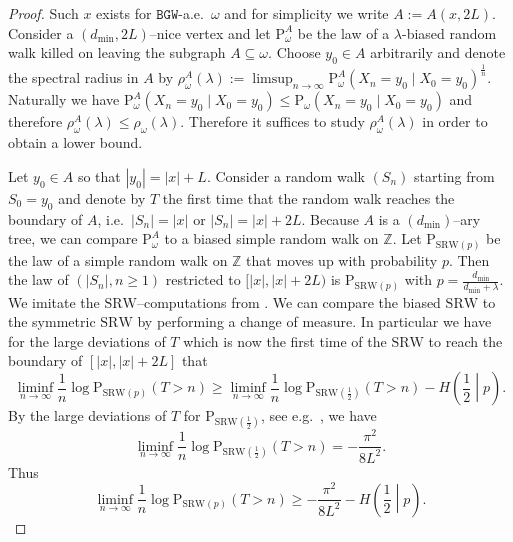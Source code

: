 \documentclass[11 pt]{article}
\theoremstyle{definition}
\numberwithin{equation}{section}
\newcommand{\ZZ}{\mathbb{Z}}
\newcommand{\Pws}{\mathrm{P}_{\omega}} %
\begin{document}
\begin{proof}
	 Such $x$ exists for $\mathtt{BGW}$-a.e.\ $\omega$ and for simplicity we write $A:= A(x,2L)$. Consider a $(d_{\min},2L)$--nice vertex and let $\mathrm{P}^{A}_{\omega}$ be the law of a $\lambda$-biased random walk killed on leaving the subgraph $A\subseteq \omega$. Choose $y_0 \in A$ arbitrarily and denote the spectral radius in $A$ by $\rho^A_{\omega}(\lambda):=\limsup_{n\to \infty} \Pws^{A}(X_n= y_0\mid X_0 = y_0)^{\frac{1}{n}}$.  
	  Naturally we have $\Pws^{A}(X_n= y_0\mid X_0 = y_0)\le \Pws(X_n= y_0\mid X_0 = y_0)$ and therefore $\rho_\omega^A(\lambda) \leq \rho_\omega(\lambda)$. Therefore it suffices to study $\rho^A_{\omega}(\lambda)$ in order to obtain a lower bound.
	 
	 Let $y_0\in A$ so that $|y_0| = |x|+ L$. Consider a random walk $(S_n)$ starting from $S_0 = y_0$ and denote  by $T$ the first time that the random walk reaches the boundary of $A$, i.e.\ $|S_n| = |x|$ or $|S_n|= |x|+2L$. Because $A$ is a $(d_{\min})$--ary tree, we can compare $ \Pws^{A}$ to a biased simple random walk on $\ZZ$. Let $\mathrm{P}_{\mathrm{SRW}(p)}$ be the law of a simple random walk on $\ZZ$ that moves up with probability $p$. Then the law of $(\vert S_n \vert, n\geq 1)$ restricted to $[\vert x \vert, \vert x \vert +2L)$ is $\mathrm{P}_{\mathrm{SRW}(p)}$ with $p = \frac{d_{\min}}{d_{\min}+\lambda}$. 
	 We imitate the $\mathrm{SRW}$--computations from \cite[Proof of (1.5), p. 249]{DGPZ-ld}. We can compare the biased $\mathrm{SRW}$ to the symmetric $\mathrm{SRW}$ by performing a change of measure. In particular we have for the large deviations of $T$ which is now the first time of the $\mathrm{SRW}$ to reach the boundary of $[\vert x \vert, \vert x \vert +2L]$ that 
	 \begin{equation*}
	 	\liminf_{n\to \infty}\frac{1}{n}\log \mathrm{P}_{\mathrm{SRW}(p)} \left( T> n \right) \geq 			\liminf_{n\to \infty}\frac{1}{n}\log \mathrm{P}_{\mathrm{SRW}(\frac{1}{2})} \left( T> n \right)-H\left( \frac{1}{2} \middle\vert p \right).
	 \end{equation*}
	 By  the large deviations of $T$ for $\mathrm{P}_{\mathrm{SRW}(\frac{1}{2})}$, see e.g.\ \cite[Page 244]{spitzer_RW}, we have
	 \begin{equation*}
	 	\liminf_{n\to \infty}\frac{1}{n}\log \mathrm{P}_{\mathrm{SRW}(\frac{1}{2})} \left( T> n \right) = - \frac{\pi^2}{8L^2}.
	 \end{equation*}
	  Thus 
	  \begin{equation*}
	 	\liminf_{n\to \infty}\frac{1}{n}\log \mathrm{P}_{\mathrm{SRW}(p)} \left( T> n \right) \geq 			- \frac{\pi^2}{8L^2} - H\left( \frac{1}{2} \middle\vert p \right) .

\end{equation*}
\end{proof}
\end{document}
